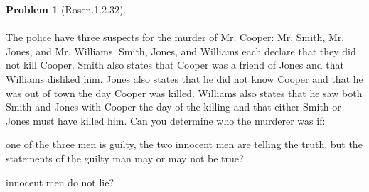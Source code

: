 \documentclass{article}
\theoremstyle{definition}
\newtheorem*{problem}{Problem}
\begin{document}
\begin{problem}[Rosen.1.2.32]\ \\
\ \\
The police have three suspects for the murder of Mr.
Cooper: Mr. Smith, Mr. Jones, and Mr. Williams. Smith,
Jones, and Williams each declare that they did not kill
Cooper. Smith also states that Cooper was a friend of
Jones and that Williams disliked him. Jones also states
that he did not know Cooper and that he was out of town
the day Cooper was killed. Williams also states that he saw both Smith and Jones with Cooper the day of the
killing and that either Smith or Jones must have killed
him. Can you determine who the murderer was if:\ \\
\begin{compactenum}
\renewcommand{\theenumi}{\alph{enumi}}
\item one of the three men is guilty, the two innocent men
are telling the truth, but the statements of the guilty
man may or may not be true?
\item innocent men do not lie?
\end{compactenum}
\end{problem}
\end{document}
